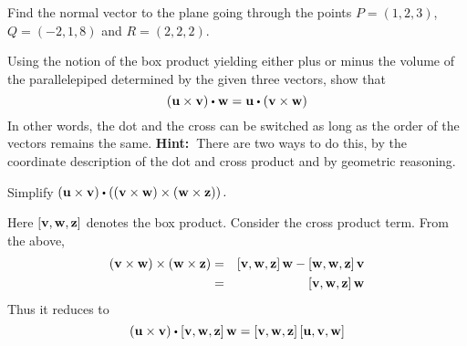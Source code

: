 \begin{enumialphparenastyle}
\begin{ex} Find the normal vector to the plane going through the points $P=(1,2,3)$, $Q=(-2,1,8)$ and $R=(2,2,2)$.
\end{ex}

\begin{ex} Using the notion of the box product yielding either plus or minus the
volume of the parallelepiped determined by the given three vectors, show
that
\begin{equation*}
\tup{\vect{u}\times \vect{v}} \dotprod \vect{w}=\vect{u}\dotprod \tup{
\vect{v}\times \vect{w}}
\end{equation*}
In other words, the dot and the cross can be switched as long as the order
of the vectors remains the same. \textbf{Hint:\ }There are two ways to do
this, by the coordinate description of the dot and cross product and by
geometric reasoning. 
\end{ex}

\begin{ex} Simplify $\tup{\vect{u}\times \vect{v}} \dotprod \tup{\tup{
\vect{v}\times \vect{w}} \times \tup{\vect{w}\times \vect{z}}} .$
\begin{sol}
Here $\left[{\bf v},{\bf w},{\bf z}\right]$ denotes the box product. Consider the cross product term. From the above,
\begin{eqnarray*}
\left({\bf v}\times {\bf w}\right) \times \left({\bf w}\times {\bf z}\right) &=& 
\left[{\bf v},{\bf w},{\bf z}\right] {\bf w}-\left[{\bf w},{\bf w},{\bf z}\right] {\bf v} \\
&=&\left[{\bf v},{\bf w},{\bf z}\right] {\bf w}
\end{eqnarray*}
Thus it reduces to
\[
\tup{\vect{u}\times \vect{v}} \dotprod \mat{\vect{v},\vect{w},\vect{z}} \vect{w}=\mat{\vect{v},\vect{w},\vect{z}} \mat{\vect{u},\vect{v},\vect{w}}
\]
\end{sol}
\end{ex}


\end{enumialphparenastyle}
